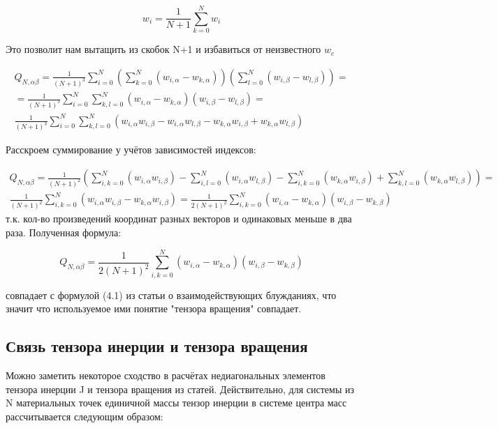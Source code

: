 \begin{equation}
    w_{i} = \frac{1}{N+1} \sum_{k=0}^{N} w_{i}
\end{equation}

Это позволит нам вытащить из скобок N+1 и избавиться от неизвестного $w_{c}$

\begin{align*}
    Q_{N,\alpha\beta} = \frac{1}{(N+1)^{3}} \sum^{N}_{i=0}(\sum^{N}_{k=0}(w_{i,\alpha} - w_{k, \alpha}))(\sum^{N}_{l=0}(w_{i,\beta} - w_{l, \beta})) = \\
    = \frac{1}{(N+1)^{3}} \sum^{N}_{i=0} \sum^{N}_{k,l=0}(w_{i,\alpha} - w_{k, \alpha})(w_{i,\beta} - w_{l, \beta}) = \\
    \frac{1}{(N+1)^{3}} \sum^{N}_{i=0} \sum^{N}_{k,l=0} (w_{i,\alpha} w_{i,\beta} - w_{i,\alpha} w_{l,\beta} - w_{k,\alpha} w_{i,\beta} + w_{k,\alpha} w_{l,\beta})
\end{align*}

Расскроем суммирование у учётов зависимостей индексов:

\begin{align*}
    Q_{N,\alpha\beta} = \frac{1}{(N+1)^{2}} (\sum^{N}_{i,k=0}(w_{i,\alpha} w_{i,\beta}) - \sum^{N}_{i,l=0}(w_{i,\alpha} w_{l,\beta}) - \sum^{N}_{i,k=0}(w_{k,\alpha} w_{i,\beta}) + \sum^{N}_{k,l=0}(w_{k,\alpha} w_{l,\beta})) = \\
    \frac{1}{(N+1)^{2}} \sum^{N}_{i,k=0}(w_{i,\alpha} w_{i,\beta} - w_{k,\alpha} w_{i,\beta}) = \frac{1}{2(N+1)^{2}} \sum^{N}_{i,k=0}(w_{i,\alpha} - w_{k, \alpha})(w_{i,\beta} - w_{k, \beta})
\end{align*}
т.к. кол-во произведений координат разных векторов и одинаковых меньше в два раза. Полученная формула:

\begin{equation}\label{eq:Ten_G2}
    Q_{N,\alpha\beta} = \frac{1}{2(N+1)^{2}} \sum^{N}_{i,k=0}(w_{i,\alpha} - w_{k, \alpha})(w_{i,\beta} - w_{k, \beta})
\end{equation}

совпадает с формулой (4.1) из статьи о взаимодействующих блужданиях\cite{Pelissetto}, что значит что используемое ими понятие "тензора вращения" совпадает.

\subsection{Связь тензора инерции и тензора вращения}

Можно заметить некоторое сходство в расчётах недиагональных элементов тензора инерции J и тензора вращения из статей\cite{Pelissetto, Janke_G}. Действительно, для системы из N материальных точек единичной массы тензор инерции в системе центра масс рассчитывается следующим образом:

